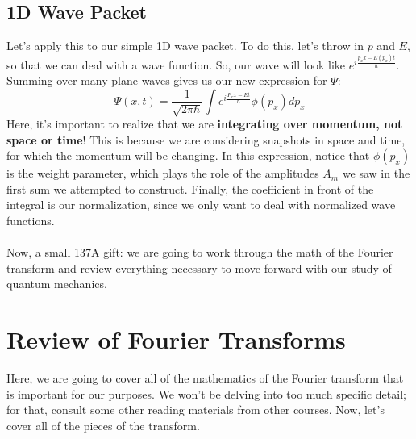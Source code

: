     \subsection{1D Wave Packet}
        Let's apply this to our simple 1D wave packet. To do this, let's throw in $p$ and $E$, so that we can deal with a wave function. So, our wave will look like $e^{i\frac{p_xx - E(p_x)t}{\hbar}}$. Summing over many plane waves gives us our new expression for $\Psi$:
        $$\Psi(x,t) = \frac{1}{\sqrt{2\pi\hbar}}\int e^{i\frac{P_xx - Et}{\hbar}}\phi(p_x)dp_x$$
        Here, it's important to realize that we are \textbf{integrating over momentum, not space or time}! This is because we are considering snapshots in space and time, for which the momentum will be changing. In this expression, notice that $\phi(p_x)$ is the weight parameter, which plays the role of the amplitudes $A_m$ we saw in the first sum we attempted to construct. Finally, the coefficient in front of the integral is our normalization, since we only want to deal with normalized wave functions.\\\\
        Now, a small 137A gift: we are going to work through the math of the Fourier transform and review everything necessary to move forward with our study of quantum mechanics.

  \section{Review of Fourier Transforms}
      Here, we are going to cover all of the mathematics of the Fourier transform that is important for our purposes. We won't be delving into too much specific detail; for that, consult some other reading materials from other courses. Now, let's cover all of the pieces of the transform.


